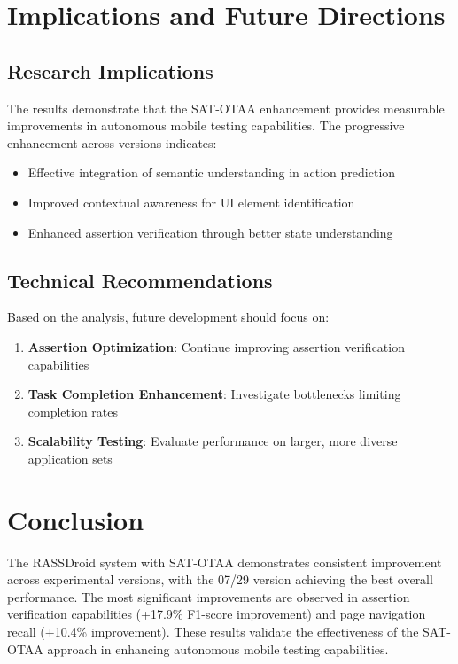 \documentclass[11pt]{article}
\begin{document}
\section{Implications and Future Directions}

\subsection{Research Implications}

The results demonstrate that the SAT-OTAA enhancement provides measurable improvements in autonomous mobile testing capabilities. The progressive enhancement across versions indicates:

\begin{itemize}
    \item Effective integration of semantic understanding in action prediction
    \item Improved contextual awareness for UI element identification
    \item Enhanced assertion verification through better state understanding
\end{itemize}

\subsection{Technical Recommendations}

Based on the analysis, future development should focus on:
\begin{enumerate}
    \item \textbf{Assertion Optimization}: Continue improving assertion verification capabilities
    \item \textbf{Task Completion Enhancement}: Investigate bottlenecks limiting completion rates
    \item \textbf{Scalability Testing}: Evaluate performance on larger, more diverse application sets
\end{enumerate}

\section{Conclusion}

The RASSDroid system with SAT-OTAA demonstrates consistent improvement across experimental versions, with the 07/29 version achieving the best overall performance. The most significant improvements are observed in assertion verification capabilities (+17.9\% F1-score improvement) and page navigation recall (+10.4\% improvement). These results validate the effectiveness of the SAT-OTAA approach in enhancing autonomous mobile testing capabilities.
\end{document}
